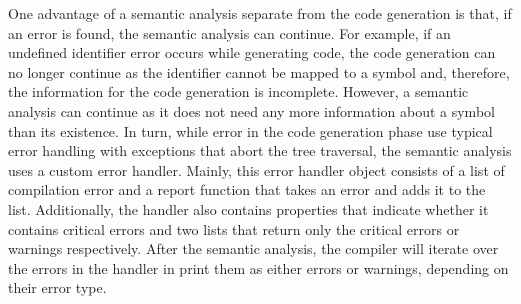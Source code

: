 One advantage of a semantic analysis separate from the code generation is that, if an error is found, the semantic analysis can continue. For example, if an undefined identifier error occurs while generating code, the code generation can no longer continue as the identifier cannot be mapped to a symbol and, therefore, the information for the code generation is incomplete. However, a semantic analysis can continue as it does not need any more information about a symbol than its existence. In turn, while error in the code generation phase use typical error handling with exceptions that abort the tree traversal, the semantic analysis uses a custom error handler. Mainly, this error handler object consists of a list of compilation error and a report function that takes an error and adds it to the list. Additionally, the handler also contains properties that indicate whether it contains critical errors and two lists that return only the critical errors or warnings respectively. After the semantic analysis, the compiler will iterate over the errors in the handler in print them as either errors or warnings, depending on their error type.%